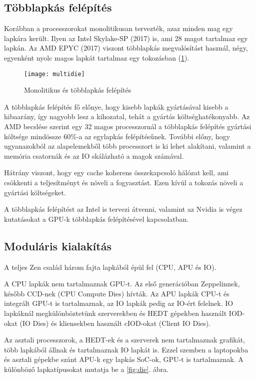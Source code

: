 \subsection{Többlapkás felépítés}
Korábban a processzorokat monolitikusan tervezték, azaz minden mag egy lapkára került.
Ilyen az Intel Skylake-SP (2017) is, ami 28 magot tartalmaz egy lapkán.
Az AMD EPYC (2017) viszont többlapkás megvalósítást használ, négy, egyenként nyolc magos lapkát tartalmaz egy tokozásban (\ref{fig:multidie}).
\begin{figure}[H]
    \texttt{[image: multidie]}
    \centering
    \caption{Monolitikus és többlapkás felépítés}
    \label{fig:multidie}
\end{figure}
A többlapkás felépítés fő előnye, hogy kisebb lapkák gyártásával kisebb a hibaarány, így nagyobb lesz a kihozatal, tehát a gyártás költséghatékonyabb.
Az AMD becslése szerint egy 32 magos processzornál a többlapkás felépítés gyártási költsége mindössze 60\%-a az egylapkás felépítésűnek.
További előny, hogy ugyanazokból az alapelemekből több processzort is ki lehet alakítani, valamint a memória csatornák és az IO skálázható a magok számával.

Hátrány viszont, hogy egy cache koherens összekapcsoló hálózat kell, ami csökkenti a teljesítményt és növeli a fogyasztást.
Ezen kívül a tokozás növeli a gyártási költségeket.

A többlapkás felépítést az Intel is tervezi átvenni, valamint az Nvidia is végez kutatásokat a GPU-k többlapkás felépítésével kapcsolatban.

\subsection{Moduláris kialakítás}
A teljes Zen család három fajta lapkából épül fel (CPU, APU és IO).

A CPU lapkák nem tartalmaznak GPU-t.
Az első generációban Zeppelinnek, később CCD-nek (CPU Compute Dies) hívták.
Az APU lapkák CPU-t és integrált GPU-t is tartalmaznak, az IO lapkák pedig az IO-ért felelnek.
IO lapkáknál megkülönböztetünk szerverekben és HEDT gépekben használt IOD-okat (IO Dies) és kliensekben használt cIOD-okat (Client IO Dies).

Az asztali processzorok, a HEDT-ek és a szerverek nem tartalmaznak grafikát, több lapkából állnak és tartalmaznak IO lapkát is.
Ezzel szemben a laptopokba és asztali gépekbe szánt APU-k egy lapkás SoC-ok, GPU-t is tartalmaznak.
A különböző lapkatípusokat mutatja be a \ref{fig:die}. ábra.


